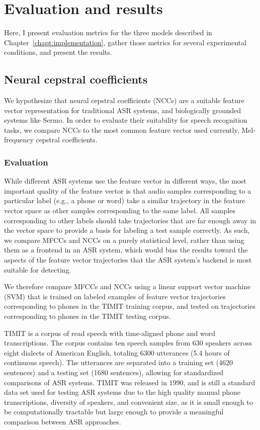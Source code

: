 \chapter{Evaluation and results}
\label{chapt:results}

Here,
I present evaluation metrics for the three models
described in Chapter~\ref{chapt:implementation},
gather those metrics
for several experimental conditions,
and present the results.

\section{Neural cepstral coefficients}

We hypothesize that
neural cepstral coefficients (NCCs)
are a suitable feature vector representation
for traditional ASR systems,
and biologically grounded systems like Sermo.
In order to evaluate
their suitability for speech recognition tasks,
we compare NCCs to the most common
feature vector used currently,
Mel-frequency cepstral coefficients.

\subsection{Evaluation}

While different ASR systems
use the feature vector in different ways,
the most important quality of the feature vector
is that audio samples corresponding
to a particular label
(e.g., a phone or word)
take a similar trajectory
in the feature vector space
as other samples corresponding to the same label.
All samples corresponding to other labels
should take trajectories that are
far enough away in the vector space
to provide a basis for labeling
a test sample correctly.
As such, we compare MFCCs and NCCs
on a purely statistical level,
rather than using them as a frontend
in an ASR system,
which would bias the results
toward the aspects of the
feature vector trajectories
that the ASR system's backend
is most suitable for detecting.

We therefore compare MFCCs and NCCs
using a linear support vector machine (SVM)
that is trained on labeled
examples of feature vector trajectories
corresponding to phones
in the TIMIT training corpus,
and tested on trajectories
corresponding to phones
in the TIMIT testing corpus.

TIMIT \citep{garofolo1993} is a corpus of read speech
with time-aligned phone and word transcriptions.
The corpus contains ten speech samples
from 630 speakers across eight dialects
of American English,
totaling 6300 utterances
(5.4 hours of continuous speech).
The utterances are separated into
a training set
(4620 sentences) and a testing set (1680 sentences),
allowing for standardized
comparisons of ASR systems.
TIMIT was released in 1990,
and is still a standard data set used
for testing ASR systems
due to the high quality
manual phone transcriptions,
diversity of speakers,
and convenient size,
as it is small enough to be
computationally tractable
but large enough to
provide a meaningful comparison
between ASR approaches.

